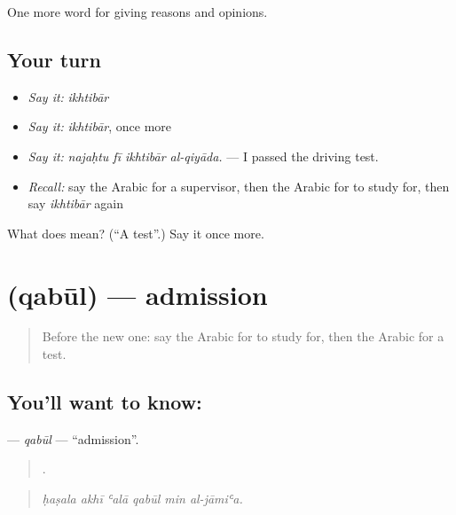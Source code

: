 \begin{grammarlens}[title={What you've built}]
One more word for giving reasons and opinions.
\end{grammarlens}

\subsection*{Your turn}
\begin{itemize}
\raggedright
  \item \emph{Say it:} \emph{ikhtibār}
  \item \emph{Say it:} \emph{ikhtibār}, once more
  \item \emph{Say it:} \emph{najaḥtu fī ikhtibār al-qiyāda.} — I passed the driving test.
  \item \emph{Recall:} say the Arabic for a supervisor, then the Arabic for to study for, then say \emph{ikhtibār} again
\end{itemize}

\begin{tcolorbox}[breakable,colback=teal!4,colframe=teal!35!black,title={Before you move on}]
What does  mean? (\textquotedblleft{}A test\textquotedblright{}.) Say it once more.
\end{tcolorbox}
\section[\texorpdfstring{\ar{قبول} (qabūl)}{قبول (qabūl)}]{ (qabūl) — admission}

\label{lesson:AR-C393-qabul}



\begin{quote}
Before the new one: say the Arabic for to study for, then the Arabic for a test.
\end{quote}

\subsection*{You'll want to know: }
\textbf{} — \emph{qabūl} — \textquotedblleft{}admission\textquotedblright{}.

\begin{quote}
     .
\end{quote}

\begin{quote}
\emph{ḥaṣala akhī ʿalā qabūl min al-jāmiʿa.}
\end{quote}

